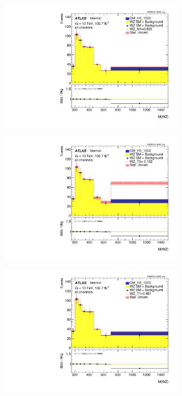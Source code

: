 \documentclass[../Bachelorarbeit.tex]{subfiles}
\begin{document}
\begin{figure}[h]
\begin{subfigure}{0.45\textwidth}
        \includegraphics[width=\textwidth]{Plots/ALL_MWZ_right_color/GM_H5_1000/M1/2022-05-07/VBSSR/all_VV_MWZ_vbs.pdf}
    \end{subfigure}
    \begin{subfigure}{0.45\textwidth}
        \includegraphics[width=\textwidth]{Plots/ALL_MWZ_right_color/GM_H5_1000/T0/2022-05-07/VBSSR/all_VV_MWZ_vbs.pdf}
    \end{subfigure}
    \begin{subfigure}{0.45\textwidth}
        \includegraphics[width=\textwidth]{Plots/1000_T1_MWZ/all_VV_MWZ_vbs.pdf}

\end{subfigure}
\end{figure}
\end{document}
